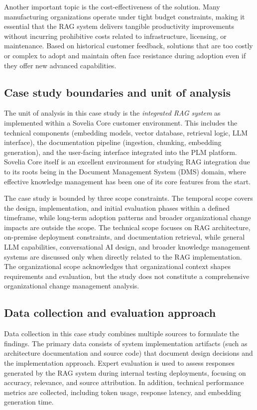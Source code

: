 Another important topic is the cost-effectiveness of the solution. Many manufacturing organizations operate under tight budget constraints, making it essential that the RAG system delivers tangible productivity improvements without incurring prohibitive costs related to infrastructure, licensing, or maintenance. Based on historical customer feedback, solutions that are too costly or complex to adopt and maintain often face resistance during adoption even if they offer new advanced capabilities.

\subsection{Case study boundaries and unit of analysis}
\label{subsec:case-boundaries}

The unit of analysis in this case study is the \emph{integrated RAG system} as implemented within a Sovelia Core customer environment. This includes the technical components (embedding models, vector database, retrieval logic, LLM interface), the documentation pipeline (ingestion, chunking, embedding generation), and the user-facing interface integrated into the PLM platform. Sovelia Core itself is an excellent environment for studying RAG integration due to its roots being in the Document Management System (DMS) domain, where effective knowledge management has been one of its core features from the start.

The case study is bounded by three scope constraints. The temporal scope covers the design, implementation, and initial evaluation phases within a defined timeframe, while long-term adoption patterns and broader organizational change impacts are outside the scope. The technical scope focuses on RAG architecture, on-premise deployment constraints, and documentation retrieval, while general LLM capabilities, conversational AI design, and broader knowledge management systems are discussed only when directly related to the RAG implementation. The organizational scope acknowledges that organizational context shapes requirements and evaluation, but the study does not constitute a comprehensive organizational change management analysis.

\subsection{Data collection and evaluation approach}
\label{subsec:data-collection}

Data collection in this case study combines multiple sources to formulate the findings. The primary data consists of system implementation artifacts (such as architecture documentation and source code) that document design decisions and the implementation approach. Expert evaluation is used to assess responses generated by the RAG system during internal testing deployments, focusing on accuracy, relevance, and source attribution. In addition, technical performance metrics are collected, including token usage, response latency, and embedding generation time.

